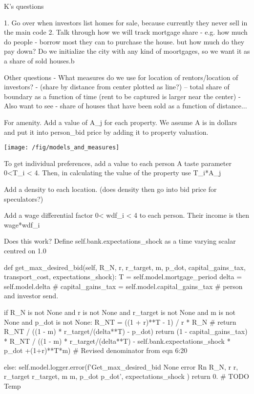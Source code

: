 K's questions

1. Go over when investors list homes for sale, because currently they never sell in the main code
2. Talk through  how we will track mortgage share - e.g. how much do people - borrow most they can to purchase the house. but how much do they pay down?
Do we initialize the city with any kind of moortgages, so we want it as a share of sold houses.b


    
Other questions
- What measures do we use for location of rentors/location of investors? 
  - (share by distance from center plotted as line?) -- total share of boundary as a function of time (rent to be captured is larger near the center)
  - Also want to see - share of houses that have been sold as a function of distance... 



   

For amenity. Add a value of A_j for each property. We assume A is in dollars and put it into person_bid price by adding it to property valuation.

\texttt{[image: /fig/models\_and\_measures]}

To get individual preferences, add a value to each person A taste parameter 0<T_i < 4. Then, in calculating the value of the property use    T_i*A_j

Add a density to each location. (does density then go into bid price for speculators?) 

Add a wage differential factor 0< wdf_i < 4 to each person. Their income is then wage*wdf_i


Does this work?  Define self.bank.expectations_shock  as a time varying scalar centred on 1.0

    def get_max_desired_bid(self, R_N, r, r_target, m, p_dot, capital_gains_tax, transport_cost, expectations_shock):
        T      = self.model.mortgage_period
        delta  = self.model.delta
        # capital_gains_tax = self.model.capital_gains_tax # person and investor send.

        if R_N is not None and r is not None and r_target is not None and m is not None and p_dot is not None:
            R_NT   = ((1 + r)**T - 1) / r * R_N
            # return R_NT / ((1 - m) * r_target/(delta**T) - p_dot) 
            return (1 - capital_gains_tax) * R_NT / ((1 - m) * r_target/(delta**T) - self.bank.expectations_shock * p_dot +(1+r)**T*m) # Revised denominator from eqn 6:20

        else:
            self.model.logger.error(f'Get_max_desired_bid None error Rn {R_N}, r {r}, r_target {r_target}, m {m}, p_dot {p_dot}', expectations_shock
)
            return 0. # TODO Temp


